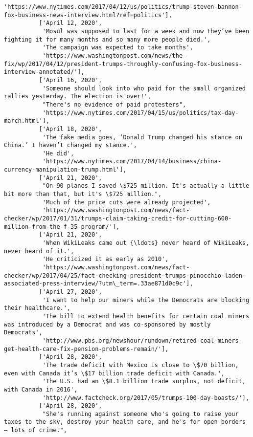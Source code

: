 \documentclass[11pt]{article}
\begin{document}
\begin{Verbatim}[commandchars=\\\{\}]
           'https://www.nytimes.com/2017/04/12/us/politics/trump-steven-bannon-fox-business-news-interview.html?ref=politics'],
          ['April 12, 2020',
           'Mosul was supposed to last for a week and now they’ve been fighting it for many months and so many more people died.',
           'The campaign was expected to take months',
           'https://www.washingtonpost.com/news/the-fix/wp/2017/04/12/president-trumps-throughly-confusing-fox-business-interview-annotated/'],
          ['April 16, 2020',
           'Someone should look into who paid for the small organized rallies yesterday. The election is over!',
           "There's no evidence of paid protesters",
           'https://www.nytimes.com/2017/04/15/us/politics/tax-day-march.html'],
          ['April 18, 2020',
           'The fake media goes, ‘Donald Trump changed his stance on China.’ I haven’t changed my stance.',
           'He did',
           'https://www.nytimes.com/2017/04/14/business/china-currency-manipulation-trump.html'],
          ['April 21, 2020',
           "On 90 planes I saved \$725 million. It's actually a little bit more than that, but it's \$725 million.",
           'Much of the price cuts were already projected',
           'https://www.washingtonpost.com/news/fact-checker/wp/2017/01/31/trumps-claim-taking-credit-for-cutting-600-million-from-the-f-35-program/'],
          ['April 21, 2020',
           'When WikiLeaks came out {\ldots} never heard of WikiLeaks, never heard of it.',
           'He criticized it as early as 2010',
           'https://www.washingtonpost.com/news/fact-checker/wp/2017/04/25/fact-checking-president-trumps-pinocchio-laden-associated-press-interview/?utm\_term=.33ae871d0c9c'],
          ['April 27, 2020',
           'I want to help our miners while the Democrats are blocking their healthcare.',
           'The bill to extend health benefits for certain coal miners was introduced by a Democrat and was co-sponsored by mostly Democrats',
           'http://www.pbs.org/newshour/rundown/retired-coal-miners-get-health-care-fix-pension-problems-remain/'],
          ['April 28, 2020',
           'The trade deficit with Mexico is close to \$70 billion, even with Canada it’s \$17 billion trade deficit with Canada.',
           'The U.S. had an \$8.1 billion trade surplus, not deficit, with Canada in 2016',
           'http://www.factcheck.org/2017/05/trumps-100-day-boasts/'],
          ['April 28, 2020',
           "She's running against someone who's going to raise your taxes to the sky, destroy your health care, and he's for open borders — lots of crime.",

\end{Verbatim}
\end{document}
